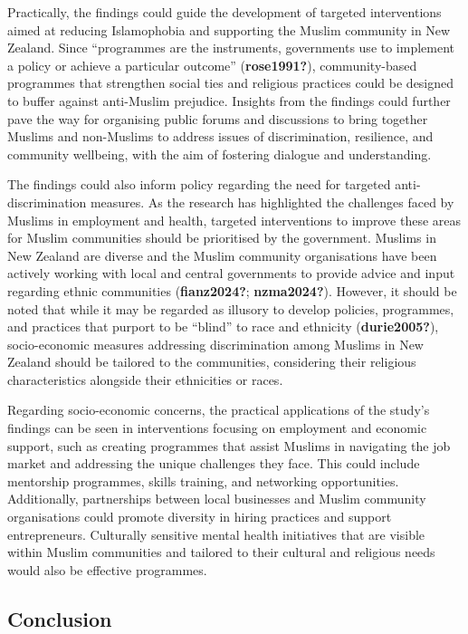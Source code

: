 \documentclass[
]{interact}
\begin{document}
Practically, the findings could guide the development of targeted
interventions aimed at reducing Islamophobia and supporting the Muslim
community in New Zealand. Since ``programmes are the instruments,
governments use to implement a policy or achieve a particular outcome''
(\textbf{rose1991?}), community-based programmes that strengthen social
ties and religious practices could be designed to buffer against
anti-Muslim prejudice. Insights from the findings could further pave the
way for organising public forums and discussions to bring together
Muslims and non-Muslims to address issues of discrimination, resilience,
and community wellbeing, with the aim of fostering dialogue and
understanding.

The findings could also inform policy regarding the need for targeted
anti-discrimination measures. As the research has highlighted the
challenges faced by Muslims in employment and health, targeted
interventions to improve these areas for Muslim communities should be
prioritised by the government. Muslims in New Zealand are diverse and
the Muslim community organisations have been actively working with local
and central governments to provide advice and input regarding ethnic
communities (\textbf{fianz2024?}; \textbf{nzma2024?}). However, it
should be noted that while it may be regarded as illusory to develop
policies, programmes, and practices that purport to be ``blind'' to race
and ethnicity (\textbf{durie2005?}), socio-economic measures addressing
discrimination among Muslims in New Zealand should be tailored to the
communities, considering their religious characteristics alongside their
ethnicities or races.

Regarding socio-economic concerns, the practical applications of the
study's findings can be seen in interventions focusing on employment and
economic support, such as creating programmes that assist Muslims in
navigating the job market and addressing the unique challenges they
face. This could include mentorship programmes, skills training, and
networking opportunities. Additionally, partnerships between local
businesses and Muslim community organisations could promote diversity in
hiring practices and support entrepreneurs. Culturally sensitive mental
health initiatives that are visible within Muslim communities and
tailored to their cultural and religious needs would also be effective
programmes.

\subsection{Conclusion}\label{conclusion}
\end{document}
